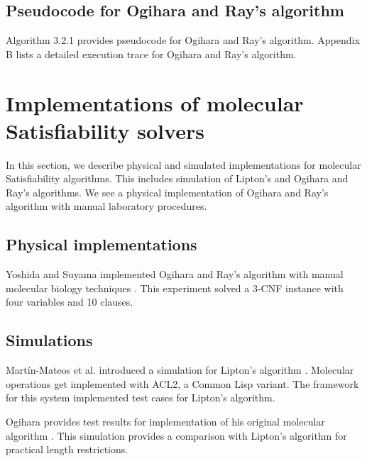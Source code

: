	\subsection{Pseudocode for Ogihara and Ray's algorithm}

	
Algorithm 3.2.1 provides pseudocode for Ogihara and Ray's algorithm.  Appendix B lists a detailed execution trace for Ogihara and Ray's algorithm.

	
	

	

\section{Implementations of molecular {\sc Satisfiability} solvers}

	In this section, we describe physical and simulated implementations for molecular {\sc Satisfiability} algorithms.  This includes simulation of Lipton's and Ogihara and Ray's algorithms.  We see a physical implementation of Ogihara and Ray's algorithm with manual laboratory procedures.

	\subsection{Physical implementations}
	

Yoshida and Suyama implemented Ogihara and Ray's algorithm with manual molecular biology techniques \cite{dnaBasedImplemetation_Yoshida2000}.  This experiment solved a 3-CNF instance with four variables and 10 clauses.

	
	\subsection{Simulations}

Martín-Mateos et al. introduced a simulation for Lipton's algorithm \cite{MartinMateos02molecularcomputation}.   Molecular operations get implemented with ACL2, a Common Lisp variant.  The framework for this system implemented test cases for Lipton's algorithm.

Ogihara provides test results for implementation of his original molecular algorithm \cite{Ogihara:1996:BFS:898228}.  This simulation provides a comparison with Lipton's algorithm for practical length restrictions.
